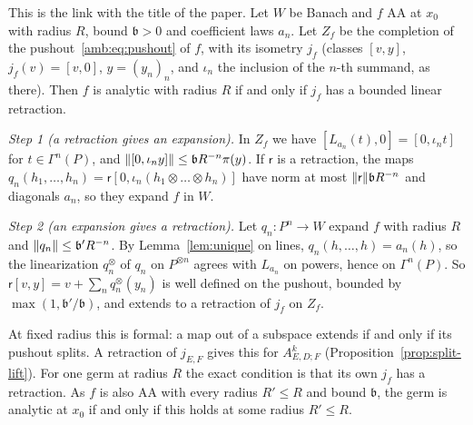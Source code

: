 \begin{remark}\label{amb:rem:splitting}
This is the link with the title of the paper. Let $W$ be Banach and $f$ AA at $x_0$ with radius $R$, bound $\mathfrak b>0$ and coefficient laws $a_n$. Let $Z_f$ be the completion of the pushout~\eqref{amb:eq:pushout} of $f$, with its isometry $j_f$ (classes $[v,y]$, $j_f(v)=[v,0]$, $y=(y_n)_n$, and $\iota_n$ the inclusion of the $n$-th summand, as there). Then $f$ is analytic with radius $R$ if and only if $j_f$ has a bounded linear retraction.

\emph{Step 1 (a retraction gives an expansion).} In $Z_f$ we have $[L_{a_n}(t),0]=[0,\iota_nt]$ for $t\in\Gamma^n(P)$, and $\lVert [0,\iota_ny]\rVert\le \mathfrak bR^{-n}\pi(y)$. If $\mathsf r$ is a retraction, the maps $q_n(h_1,\dots,h_n)=\mathsf r[0,\iota_n(h_1\otimes\dots\otimes h_n)]$ have norm at most $\lVert \mathsf r\rVert\mathfrak bR^{-n}$ and diagonals $a_n$, so they expand $f$ in $W$.

\emph{Step 2 (an expansion gives a retraction).} Let $q_n\colon P^n\to W$ expand $f$ with radius $R$ and $\lVert q_n\rVert\le \mathfrak b'R^{-n}$. By Lemma~\ref{lem:unique} on lines, $q_n(h,\dots,h)=a_n(h)$, so the linearization $q_n^\otimes$ of $q_n$ on $P^{\otimes n}$ agrees with $L_{a_n}$ on powers, hence on $\Gamma^n(P)$. So $\mathsf r[v,y]=v+\sum_nq_n^\otimes(y_n)$ is well defined on the pushout, bounded by $\max(1,\mathfrak b'/\mathfrak b)$, and extends to a retraction of $j_f$ on $Z_f$.

At fixed radius this is formal: a map out of a subspace extends if and only if its pushout splits. A retraction of $j_{E,F}$ gives this for $A^k_{E,D;F}$ (Proposition~\ref{prop:split-lift}). For one germ at radius $R$ the exact condition is that its own $j_f$ has a retraction. As $f$ is also AA with every radius $R'\le R$ and bound $\mathfrak b$, the germ is analytic at $x_0$ if and only if this holds at some radius $R'\le R$.
\end{remark}
